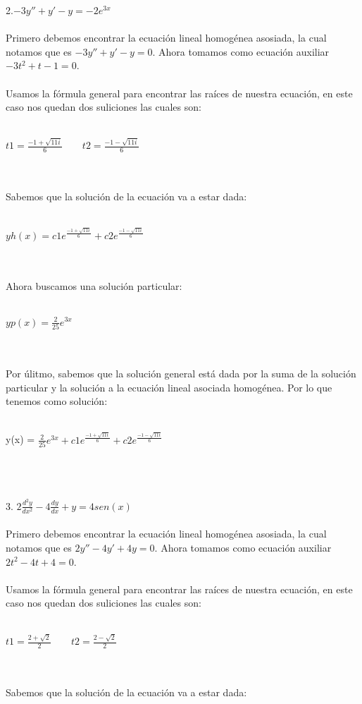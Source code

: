 \documentclass[a4paper,10pt]{article}
\begin{document}
2.$-3y'' + y' -y = -2e^{3x}$\\\\
Primero debemos encontrar la ecuación lineal homogénea asosiada, la cual notamos que es $-3y'' + y' - y=0 $. Ahora tomamos como ecuación auxiliar $-3t^2 + t - 1 =0$.\\\\
Usamos la fórmula general para encontrar las raíces de nuestra ecuación, en este caso nos quedan dos suliciones las cuales son:\\\\
\centerline{$t1= \frac{-1+  \sqrt{11 i}}{6} \quad\quad t2=\frac{-1-\sqrt{11i}}{6}$ }\\\\
Sabemos que la solución de la ecuación va a estar dada:\\\\
\centerline{$yh(x)= c1e^{\frac{-1+  \sqrt{11 i}}{6}}+c2e^{\frac{-1-\sqrt{11i}}{6}}$}\\\\
Ahora buscamos una solución particular:\\\\
\centerline{$yp(x)= \frac{2}{25} e^{3x}$ }\\\\
Por úlitmo, sabemos que la solución general está dada por la suma de la solución particular y la solución a la ecuación lineal asociada homogénea. Por lo que tenemos como solución:\\\\
\centerline{y(x) = $ \frac{2}{25} e^{3x} + c1e^{\frac{-1+  \sqrt{11 i}}{6}}+c2e^{\frac{-1-\sqrt{11i}}{6}}$}\\\\\\
3. $ 2\frac{d^2 y}{dx^2} - 4\frac{dy}{dx} + y = 4sen(x) $ \\\\
Primero debemos encontrar la ecuación lineal homogénea asosiada, la cual notamos que es $2y'' - 4y' + 4 y=0 $. Ahora tomamos como ecuación auxiliar $2t^2 - 4t + 4 =0$.\\\\
Usamos la fórmula general para encontrar las raíces de nuestra ecuación, en este caso nos quedan dos suliciones las cuales son:\\\\
\centerline{$t1= \frac{2+  \sqrt{2}}{2} \quad\quad t2=\frac{2-\sqrt{2}}{2}$ }\\\\
Sabemos que la solución de la ecuación va a estar dada:\\\\
\end{document}
